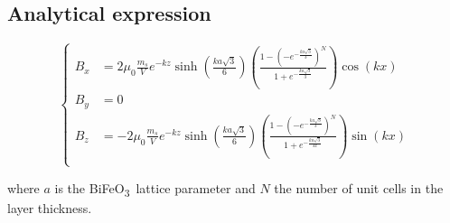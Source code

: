 \documentclass[a4paper,12pt]{article}
\newcommand{\BFO}{BiFeO\textsubscript{3}\ }
\begin{document}
\subsection{Analytical expression}

\begin{equation*}
    \left \lbrace
      \begin{aligned}
        B_x & = 2 \mu_0 \frac{m_s}{V} e^{-k z} \sinh \left(\frac{ka\sqrt{3}}{6}\right)
        \left(\frac{1-(-e^{-\frac{ka\sqrt{3}}{3}})^N}{1+e^{-\frac{ka\sqrt{3}}{3}}}\right) \cos(kx) \\
        B_y &= 0 \\
        B_z & = -2 \mu_0 \frac{m_s}{V} e^{-k z} \sinh\left( \frac{ka\sqrt{3}}{6}\right)
        \left( \frac{1-(-e^{-\frac{ka\sqrt{3}}{3}})^N}{1+e^{-\frac{ka\sqrt{3}}{3x}}} \right) \sin(kx) \\ 
      \end{aligned}
    \right.
  \end{equation*}

  where $a$ is the \BFO lattice parameter and $N$ the number of unit cells in the layer thickness.
\end{document}
